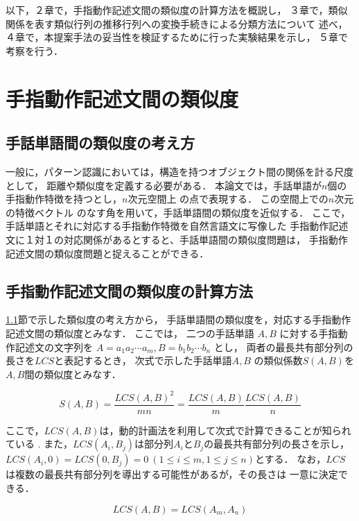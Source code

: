 以下，２章で，手指動作記述文間の類似度の計算方法を概説し，
３章で，類似関係を表す類似行列の推移行列への変換手続きによる分類方法について
述べ，４章で，本提案手法の妥当性を検証するために行った実験結果を示し，
５章で考察を行う．

\section{手指動作記述文間の類似度}

\subsection{手話単語間の類似度の考え方}\label{idea}

一般に，パターン認識においては，構造を持つオブジェクト間の関係を計る尺度として，
距離や類似度を定義する必要がある\cite{Tanaka1990}．
本論文では，手話単語が$n$個の手指動作特徴を持つとし，$n$次元空間上
の点で表現する．
この空間上での$n$次元の特徴ベクトル
のなす角を用いて，手話単語間の類似度を近似する．
ここで，手話単語とそれに対応する手指動作特徴を自然言語文に写像した
手指動作記述文に１対１の対応関係があるとすると、手話単語間の類似度問題は，
手指動作記述文間の類似度問題と捉えることができる．

\subsection{手指動作記述文間の類似度の計算方法}

\ref{idea}節で示した類似度の考え方から，
手話単語間の類似度を，対応する手指動作記述文間の類似度とみなす．
ここでは，
二つの手話単語 $A, B$ に対する手指動作記述文の文字列を
$A = a_1 a_2 \cdots a_m, B = b_1 b_2 \cdots b_n$  とし，
両者の最長共有部分列の長さを$LCS$と表記するとき，
次式で示した手話単語$A,B$ の類似係数$S(A, B)$を
$A,B$間の類似度とみなす\cite{Adachi1993a}．

\begin{equation}
\label{sim}
S(A, B) = \frac{LCS(A,B)^2}{mn} = \frac{LCS(A,B)}{m}\frac{LCS(A,B)}{n}
\end{equation}

ここで，$LCS(A,B)$は，動的計画法を利用して次式で計算できることが知られている
\cite{Thomas1990}.
また，$LCS(A_i,B_j)$は部分列$A_i$と$B_j$の最長共有部分列の長さを示し，
$LCS(A_i,0)=LCS(0,B_j)=0\  (1\le i \le m, 1\le j \le n)$とする．
なお，$LCS$は複数の最長共有部分列を導出する可能性があるが，その長さは
一意に決定できる．

\begin{equation}
LCS ( A, B ) = LCS ( A_m, A_n )
\end{equation}

